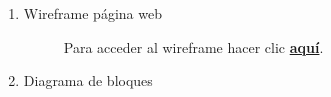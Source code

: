 \begin{enumerate}[{Anexo} 1:]
    \item \label{a:wireframe}  Wireframe página web

        \begin{figure}[ht]
            \centering
            \caption{ Para acceder al wireframe hacer clic \textbf{{\color{G} \href{https://www.figma.com/proto/UcLLvGMHsnwAyplBPTTPbq/greenTower?node-id=7:0&scaling=min-zoom}{aquí}}}.  }
        \end{figure}

    \newpage
    \thispagestyle{plain}
    \item \label{a:diag_bloques} Diagrama de bloques
        \begin{figure}[ht]
            \centering
            \caption{}
            \label{fig:diag_bloques}
        \end{figure}


\end{enumerate}


